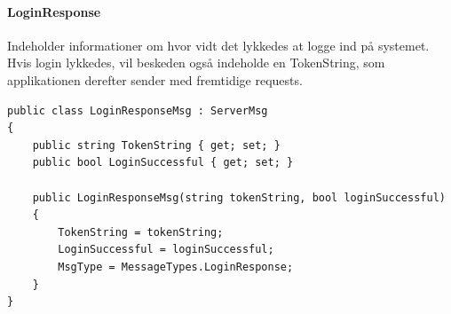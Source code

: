 \paragraph{LoginResponse}
Indeholder informationer om hvor vidt det lykkedes at logge ind på systemet. Hvis login lykkedes, vil beskeden også indeholde en TokenString, som applikationen derefter sender med fremtidige requests.
\begin{lstlisting}[caption=LoginResponse, label=code:LoginResponse]
public class LoginResponseMsg : ServerMsg
{
	public string TokenString { get; set; }
	public bool LoginSuccessful { get; set; }
	
	public LoginResponseMsg(string tokenString, bool loginSuccessful)
	{
		TokenString = tokenString;
		LoginSuccessful = loginSuccessful;
		MsgType = MessageTypes.LoginResponse;
	}
}
\end{lstlisting}